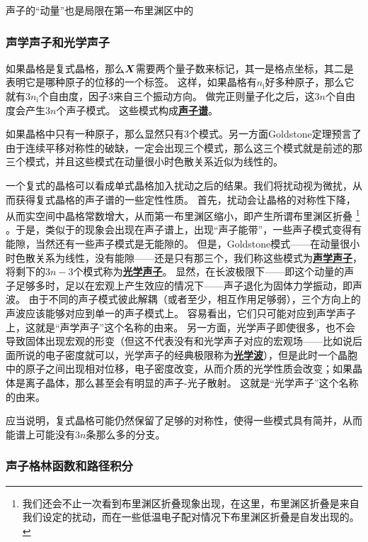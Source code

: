 \documentclass[hyperref, UTF8, a4paper]{ctexart}
\renewcommand{\autoref}{\prettyref}
\newcommand*{\concept}[1]{\underline{\textbf{#1}}}
\begin{document}
声子的“动量”也是局限在第一布里渊区中的

\subsubsection{声学声子和光学声子}

如果晶格是复式晶格，那么$\vb*{X}$需要两个量子数来标记，其一是格点坐标，其二是表明它是哪种原子的位移的一个标签。
这样，如果晶格有$n_\text{i}$好多种原子，那么它就有$3n_\text{i}$个自由度，因子$3$来自三个振动方向。
做完正则量子化之后，这$3n$个自由度会产生$3n$个声子模式。
这些模式构成\concept{声子谱}。

如果晶格中只有一种原子，那么显然只有$3$个模式。另一方面Goldstone定理预言了由于连续平移对称性的破缺，一定会出现三个模式，那么这三个模式就是前述的那三个模式，并且这些模式在动量很小时色散关系近似为线性的。

一个复式的晶格可以看成单式晶格加入扰动之后的结果。我们将扰动视为微扰，从而获得复式晶格的声子谱的一些定性性质。
首先，扰动会让晶格的对称性下降，从而实空间中晶格常数增大，从而第一布里渊区缩小，即产生所谓布里渊区折叠%
\footnote{
    我们还会不止一次看到布里渊区折叠现象出现，在这里，布里渊区折叠是来自我们设定的扰动，而在一些低温电子配对情况下布里渊区折叠是自发出现的。
}%
。于是，类似于\autoref{fig:bloch-energy-band}的现象会出现在声子谱上，出现“声子能带”，一些声子模式变得有能隙，当然还有一些声子模式是无能隙的。
但是，Goldstone模式——在动量很小时色散关系为线性，没有能隙——还是只有那三个，我们称这些模式为\concept{声学声子}，将剩下的$3n-3$个模式称为\concept{光学声子}。
显然，在长波极限下——即这个动量的声子足够多时，足以在宏观上产生效应的情况下——声子退化为固体力学振动，即声波。
由于不同的声子模式彼此解耦（或者至少，相互作用足够弱），三个方向上的声波应该能够对应到单一的声子模式上。
容易看出，它们只可能对应到声学声子上，这就是“声学声子”这个名称的由来。
另一方面，光学声子即使很多，也不会导致固体出现宏观的形变（但这不代表没有和光学声子对应的宏观场——比如说后面所说的电子密度就可以，光学声子的经典极限称为\concept{光学波}），但是此时一个晶胞中的原子之间出现相对位移，电子密度改变，从而介质的光学性质会改变；如果晶体是离子晶体，那么甚至会有明显的声子-光子散射。
这就是“光学声子”这个名称的由来。

应当说明，复式晶格可能仍然保留了足够的对称性，使得一些模式具有简并，从而能谱上可能没有$3n$条那么多的分支。

\subsubsection{声子格林函数和路径积分}
\end{document}
